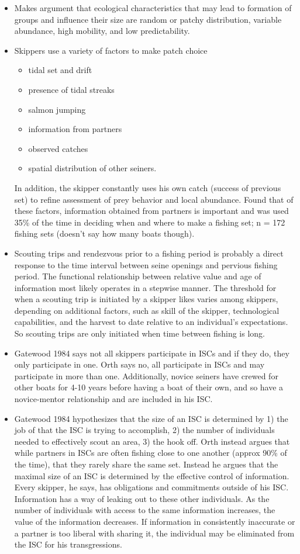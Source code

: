 \documentclass[a4paper,10pt]{article}
\begin{document}
\begin{itemize}
\item Makes argument that ecological characteristics that may lead to formation of groups and influence their size are random or patchy distribution, variable abundance, high mobility, and low predictability. 

\item Skippers use a variety of factors to make patch choice
\begin{itemize}
\item tidal set and drift
\item presence of tidal streaks
\item salmon jumping
\item information from partners
\item observed catches
\item spatial distribution of other seiners.
\end{itemize}
In addition, the skipper constantly uses his own catch (success of previous set) to refine assessment of prey behavior and local abundance. Found that of these factors, information obtained from partners is important and was used 35\% of the time in deciding when and where to make a fishing set; n = 172 fishing sets (doesn't say how many boats though). 
\item Scouting trips and rendezvous prior to a fishing period is probably a direct response to the time interval between seine openings and pervious fishing period. The functional relationship between relative value and age of information most likely operates in a stepwise manner. The threshold for when a scouting trip is initiated by a skipper likes varies among skippers, depending on additional factors, such as skill of the skipper, technological capabilities, and the harvest to date relative to an individual's expectations. So scouting trips are only initiated when time between fishing is long. 
\item {\color{Grey}Gatewood 1984} says not all skippers participate in ISCs and if they do, they only participate in one. Orth says no, all participate in ISCs and may participate in more than one. Additionally, novice seiners have crewed for other boats for 4-10 years before having a boat of their own, and so have a novice-mentor relationship and are included in his ISC.
\item {\color{Grey}Gatewood 1984} hypothesizes that the size of an ISC is determined by 1) the job of that the ISC is trying to accomplish, 2) the number of individuals needed to effectively scout an area, 3) the hook off. Orth instead argues that while partners in ISCs are often fishing close to one another (approx 90\% of the time), that they rarely share the same set. Instead he argues that the maximal size of an ISC is determined by the effective control of information. Every skipper, he says, has obligations and commitments outside of his ISC. Information has a way of leaking out to these other individuals. As the number of individuals with access to the same information increases, the value of the information decreases. If information in consistently inaccurate or a partner is too liberal with sharing it, the individual may be eliminated from the ISC for his transgressions. 

\end{itemize}
\end{document}
